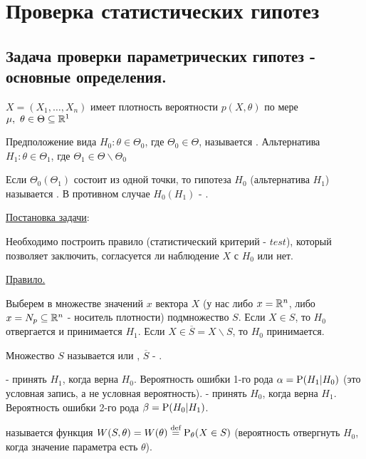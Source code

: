 \section{Проверка статистических гипотез}

\subsection{Задача проверки параметрических гипотез - основные определения.}
\(X = (X_1, \ldots, X_n)\) имеет плотность вероятности \(p(X, \theta)\)
по мере \(\mu,\ \theta\in\Theta\subseteq\R^1\)

\begin{definition}
    Предположение вида \(H_0: \theta\in\Theta_0\), где
    \(\Theta_0\in\Theta\), называется .
    Альтернатива \(H_1:\theta\in\Theta_1\), где
    \(\Theta_1\in\Theta\backslash\Theta_0\)
\end{definition}
\begin{definition}
    Если \(\Theta_0(\Theta_1)\) состоит из одной точки,
    то гипотеза \(H_0\) (альтернатива \(H_1\)) называется
    .
    В противном случае \(H_0(H_1)\) - .
\end{definition}

\underline{Постановка задачи}:

Необходимо построить правило (статистический критерий - \(test\)),
который позволяет заключить, согласуется ли наблюдение \(X\)
с \(H_0\) или нет.

\underline{Правило.}

Выберем в множестве значений \(x\) вектора \(X\) (у нас либо
\(x = \R^n\), либо \(x = N_p \subseteq \R^n\) - носитель
плотности) подмножество \(S\). Если \(X \in S\), то \(H_0\) отвергается и
принимается \(H_1\). Если \(X \in \overline{S} = X \backslash S\), то
\(H_0\) принимается.

\begin{definition}
    Множество \(S\) называется  или ,
    \(\overline{S}\) - .
\end{definition}
\begin{definition}
     - принять \(H_1\), когда
    верна \(H_0\). Вероятность ошибки 1-го рода $\alpha
    = \P(H_1 | H_0)$ (это условная запись, а не условная вероятность).
     - принять \(H_0\), когда
    верна \(H_1\). Вероятность ошибки 2-го рода $\beta
    = \P(H_0 | H_1)$.
\end{definition}
\begin{definition}
     называется функция \(W(S, \theta) = W(\theta)
    \defeq\P_\theta(X\in S)\) (вероятность отвергнуть \(H_0\), когда
    значение параметра есть \(\theta\)).
\end{definition}

